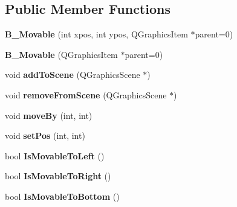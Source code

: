 \subsection*{Public Member Functions}
\begin{DoxyCompactItemize}
\item 
\hypertarget{class_b___movable_ac874fc12d19502117d0bfc396d1059d2}{}{\bfseries B\+\_\+\+Movable} (int xpos, int ypos, Q\+Graphics\+Item $\ast$parent=0)\label{class_b___movable_ac874fc12d19502117d0bfc396d1059d2}

\item 
\hypertarget{class_b___movable_aef88fa8933731c08731796a9ee3fda6b}{}{\bfseries B\+\_\+\+Movable} (Q\+Graphics\+Item $\ast$parent=0)\label{class_b___movable_aef88fa8933731c08731796a9ee3fda6b}

\item 
\hypertarget{class_b___movable_ad7b6d6a5ed18959709d18af3496b0b12}{}void {\bfseries add\+To\+Scene} (Q\+Graphics\+Scene $\ast$)\label{class_b___movable_ad7b6d6a5ed18959709d18af3496b0b12}

\item 
\hypertarget{class_b___movable_a1571be55ec5ed1cc99e3212186601c4c}{}void {\bfseries remove\+From\+Scene} (Q\+Graphics\+Scene $\ast$)\label{class_b___movable_a1571be55ec5ed1cc99e3212186601c4c}

\item 
\hypertarget{class_b___movable_a3c6637ad9ce655e8b330e1f81f92ccb9}{}void {\bfseries move\+By} (int, int)\label{class_b___movable_a3c6637ad9ce655e8b330e1f81f92ccb9}

\item 
\hypertarget{class_b___movable_af316b8d41903a21388032e7cabde4baf}{}void {\bfseries set\+Pos} (int, int)\label{class_b___movable_af316b8d41903a21388032e7cabde4baf}

\item 
\hypertarget{class_b___movable_a96a0a18c27314600a19d467b6f7820a3}{}bool {\bfseries Is\+Movable\+To\+Left} ()\label{class_b___movable_a96a0a18c27314600a19d467b6f7820a3}

\item 
\hypertarget{class_b___movable_a134b648413c6d27c008f8a0655ffa0f9}{}bool {\bfseries Is\+Movable\+To\+Right} ()\label{class_b___movable_a134b648413c6d27c008f8a0655ffa0f9}

\item 
\hypertarget{class_b___movable_a190fdc076141ae6698334bfe4dfd61a3}{}bool {\bfseries Is\+Movable\+To\+Bottom} ()\label{class_b___movable_a190fdc076141ae6698334bfe4dfd61a3}


\end{DoxyCompactItemize}
